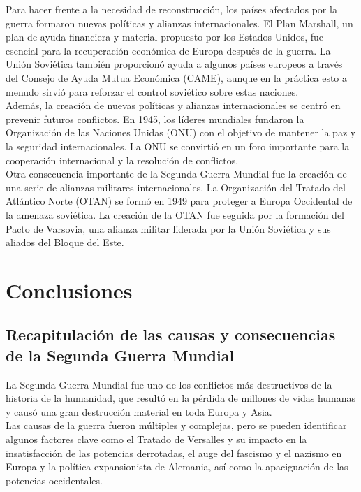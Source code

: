 \documentclass{article}
\theoremstyle{mytheoremstyle}
\theoremstyle{mytheoremstyle}
\theoremstyle{myproblemstyle}
\begin{document}
Para hacer frente a la necesidad de reconstrucción, los países afectados por la guerra formaron nuevas políticas y alianzas internacionales. El Plan Marshall, un plan de ayuda financiera y material propuesto por los Estados Unidos, fue esencial para la recuperación económica de Europa después de la guerra. La Unión Soviética también proporcionó ayuda a algunos países europeos a través del Consejo de Ayuda Mutua Económica (CAME), aunque en la práctica esto a menudo sirvió para reforzar el control soviético sobre estas naciones.\\

Además, la creación de nuevas políticas y alianzas internacionales se centró en prevenir futuros conflictos. En 1945, los líderes mundiales fundaron la Organización de las Naciones Unidas (ONU) con el objetivo de mantener la paz y la seguridad internacionales. La ONU se convirtió en un foro importante para la cooperación internacional y la resolución de conflictos.\\

Otra consecuencia importante de la Segunda Guerra Mundial fue la creación de una serie de alianzas militares internacionales. La Organización del Tratado del Atlántico Norte (OTAN) se formó en 1949 para proteger a Europa Occidental de la amenaza soviética. La creación de la OTAN fue seguida por la formación del Pacto de Varsovia, una alianza militar liderada por la Unión Soviética y sus aliados del Bloque del Este.\\
\newpage
\section{Conclusiones}
\subsection{Recapitulación de las causas y consecuencias de la Segunda Guerra Mundial}

La Segunda Guerra Mundial fue uno de los conflictos más destructivos de la historia de la humanidad, que resultó en la pérdida de millones de vidas humanas y causó una gran destrucción material en toda Europa y Asia.\\

Las causas de la guerra fueron múltiples y complejas, pero se pueden identificar algunos factores clave como el Tratado de Versalles y su impacto en la insatisfacción de las potencias derrotadas, el auge del fascismo y el nazismo en Europa y la política expansionista de Alemania, así como la apaciguación de las potencias occidentales.\\
\end{document}
